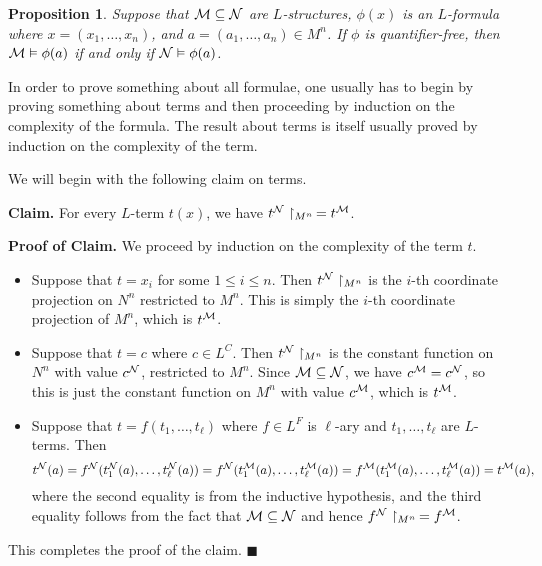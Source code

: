 \documentclass[10pt]{article}
\makeatletter
\theoremstyle{newstyle}
\newtheorem{prop}[thm]{Proposition}
\newenvironment{pf}[1][\proofname]{\par
  \pushQED{\qed}%
  \normalfont \topsep0\p@\relax
  \trivlist
  \item[\hskip\labelsep\scshape
  #1\@addpunct{.}]\ignorespaces
}{%
  \popQED\endtrivlist\@endpefalse
}
\makeatother
\begin{document}
\begin{prop}
Suppose that ${\cal M} \subseteq {\cal N}$ are $L$-structures, $\phi(x)$ is an $L$-formula 
where $x = (x_1, \dots, x_n)$, and $a = (a_1, \dots, a_n) \in M^n$. If $\phi$ is quantifier-free, 
then ${\cal M} \vDash \phi(a)$ if and only if ${\cal N} \vDash \phi(a)$.
\end{prop}
\begin{pf}
In order to prove something about all formulae, one usually has to begin by proving something about terms and then proceeding by induction on the complexity of the formula. The result about terms is itself usually proved by induction on the complexity of the term.

We will begin with the following claim on terms. 

{\bf Claim.} For every $L$-term $t(x)$, we have $t^{\cal N} \upharpoonright_{M^n} \, = t^{\cal M}$.

{\bf Proof of Claim.} We proceed by induction on the complexity of the term $t$.
\begin{itemize}
    \item Suppose that $t = x_i$ for some $1 \leq i \leq n$. Then $t^{\cal N} \upharpoonright_{M^n}$ 
    is the $i$-th coordinate projection on $N^n$ restricted to $M^n$. This is simply 
    the $i$-th coordinate projection of $M^n$, which is $t^{\cal M}$.
    \item Suppose that $t = c$ where $c \in L^C$. Then $t^{\cal N} \upharpoonright_{M^n}$ is 
    the constant function on $N^n$ with value $c^{\cal N}$, restricted to $M^n$. 
    Since ${\cal M \subseteq N}$, we have $c^{\cal M} = c^{\cal N}$, so this is 
    just the constant function on $M^n$ with value $c^{\cal M}$, which is $t^{\cal M}$.
    \item Suppose that $t = f(t_1, \dots, t_\ell)$ where $f \in L^F$ is $\ell$-ary 
    and $t_1, \dots, t_\ell$ are $L$-terms. Then 
    \[ t^{\cal N}(a) = f^{\cal N}(t_1^{\cal N}(a), \dots, t_\ell^{\cal N}(a)) 
    = f^{\cal N}(t_1^{\cal M}(a), \dots, t_\ell^{\cal M}(a)) = f^{\cal M}(t_1^{\cal M}(a), 
    \dots, t_\ell^{\cal M}(a)) = t^{\cal M}(a), \]
    where the second equality is from the inductive hypothesis, and the third equality 
    follows from the fact that ${\cal M \subseteq N}$ and hence $f^{\cal N} \upharpoonright_{M^n}
    \, = f^{\cal M}$.
\end{itemize}
This completes the proof of the claim. \hfill $\blacksquare$


\end{pf}
\end{document}
